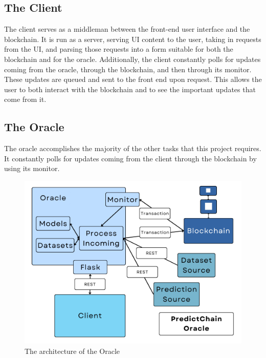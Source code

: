 \documentclass{ledger}
\begin{document}
\subsection{The Client}

The client serves as a middleman between the front-end user interface and the blockchain.  It is run as a server, serving UI content to the user, taking in requests from the UI, and parsing those requests into a form suitable for both the blockchain and for the oracle.  Additionally, the client constantly polls for updates coming from the oracle, through the blockchain, and then through its monitor.  These updates are queued and sent to the front end upon request. This allows the user to both interact with the blockchain and to see the important updates that come from it.

\subsection{The Oracle}

The oracle accomplishes the majority of the other tasks that this project requires.  It constantly polls for updates coming from the client through the blockchain by using its monitor.

\begin{figure}[H]
    \begin{center}
        \begin{minipage}{0.6\textwidth}
        \centering
        \includegraphics[width=\linewidth]{images/oracleDiagram}
        \caption{The architecture of the Oracle}\label{Fig:oracleDiagram}
    \end{minipage}\hfill
    \end{center}
\end{figure}
\end{document}
